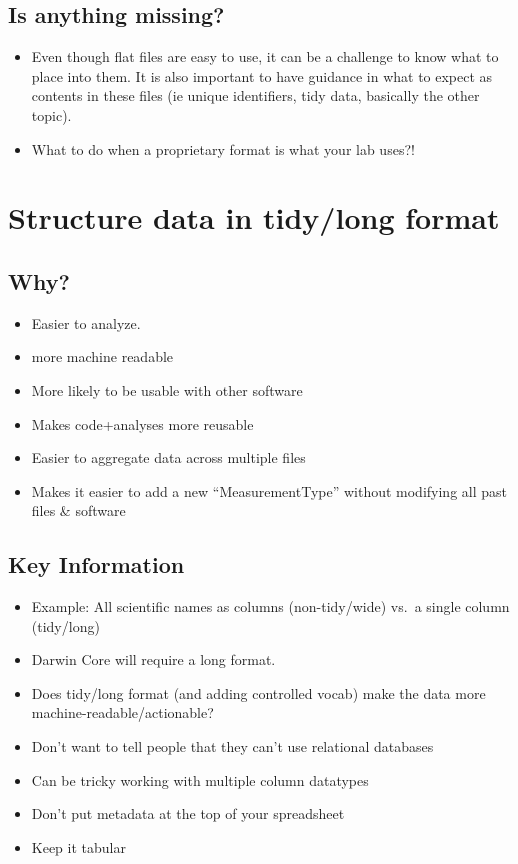 \documentclass[
  oneside]{book}
\providecommand{\tightlist}{%
  \setlength{\itemsep}{0pt}\setlength{\parskip}{0pt}}
\begin{document}
\hypertarget{is-anything-missing}{%
\subsection{Is anything missing?}\label{is-anything-missing}}

\begin{itemize}
\tightlist
\item
  Even though flat files are easy to use, it can be a challenge to know what to place into them. It is also important to have guidance in what to expect as contents in these files (ie unique identifiers, tidy data, basically the other topic).
\item
  What to do when a proprietary format is what your lab uses?!
\end{itemize}

\hypertarget{structure-data-in-tidylong-format}{%
\section{Structure data in tidy/long format}\label{structure-data-in-tidylong-format}}

\hypertarget{why-1}{%
\subsection{Why?}\label{why-1}}

\begin{itemize}
\tightlist
\item
  Easier to analyze.
\item
  more machine readable
\item
  More likely to be usable with other software
\item
  Makes code+analyses more reusable
\item
  Easier to aggregate data across multiple files
\item
  Makes it easier to add a new ``MeasurementType'' without modifying all past files \& software
\end{itemize}

\hypertarget{key-information-1}{%
\subsection{Key Information}\label{key-information-1}}

\begin{itemize}
\tightlist
\item
  Example: All scientific names as columns (non-tidy/wide) vs.~a single column (tidy/long)
\item
  Darwin Core will require a long format.
\item
  Does tidy/long format (and adding controlled vocab) make the data more machine-readable/actionable?
\item
  Don't want to tell people that they can't use relational databases
\item
  Can be tricky working with multiple column datatypes
\item
  Don't put metadata at the top of your spreadsheet
\item
  Keep it tabular
\end{itemize}
\end{document}
